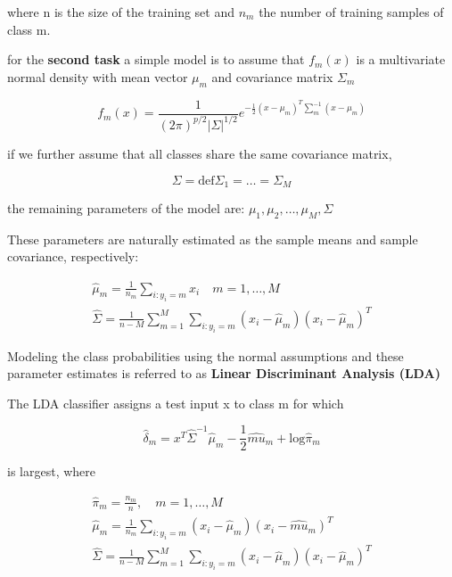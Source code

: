 where n is the size of the training set and $n_m$ the number of training samples of class m. 

for the \textbf{second task} a simple model is to assume that $f_m(x)$ is a multivariate normal density with mean vector $\mu_m$ and covariance matrix $\Sigma_m$

\begin{equation}
f_m(x) = \frac{1} {(2\pi)^{p/2}|\Sigma|^{1/2}} e^{-\frac{1} {2}(x-\mu_m)^{T}\sum_{m}^{-1}(x-\mu_m) }
\end{equation}

if we further assume that all classes share the same covariance matrix, 

\begin{equation}
\Sigma = \text{def} \Sigma_1  = \ldots = \Sigma_M
\end{equation}

the remaining parameters of the model are: $\mu_1,\mu_2, \ldots , \mu_M, \Sigma$

These parameters are naturally estimated as the sample means and sample covariance, respectively: 

\begin{equation}
\begin{aligned}
\hat{\mu}_m = \frac{1} {n_m} \sum_{i:y_i=m}^{} x_i \quad m = 1, \ldots,M \\
\hat{\Sigma} = \frac{1} {n-M} \sum_{m=1}^{M} \sum_{i:y_i=m}^{} (x_i - \hat{\mu}_m)(x_i-\hat{\mu}_m)^{T}
\end{aligned}
\end{equation}

\begin{definition}{}
Modeling the class probabilities using the normal assumptions and these parameter estimates is referred to as \textbf{Linear Discriminant Analysis (LDA)}
\end{definition}

The LDA classifier assigns a test input x to class m for which 

\begin{equation}
\hat{\delta}_m = x^{T}\hat{\Sigma}^{-1}\hat{\mu}_m - \frac{1} {2} \hat{mu}_m + \text{log}\hat{\pi}_m
\end{equation}

is largest, where 

\begin{equation}
\begin{aligned}
\hat{\pi}_m = \frac{n_m} {n}, \quad m = 1,\ldots,M \\
\hat{\mu}_m = \frac{1} {n_m} \sum_{i:y_i=m}^{} (x_i-\hat{\mu}_m)(x_i- \hat{mu}_m)^{T} \\
\hat{\Sigma} = \frac{1} {n-M} \sum_{m=1}^{M} \sum_{i:y_i=m}^{} (x_i- \hat{\mu}_m)(x_i - \hat{\mu}_m)^{T}
\end{aligned}
\end{equation}


